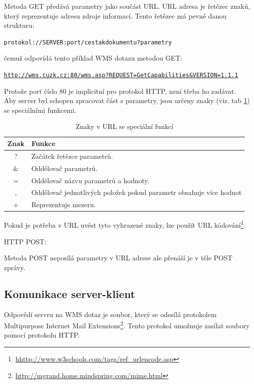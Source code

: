 \documentclass[a4paper,12pt]{article}
\begin{document}
Metoda GET předává parametry jako součást URL. URL adresa  je řetězec znaků, který reprezentuje adresu zdroje informací. Tento řetězec má pevně danou strukturu:
	
\begin{alltt}\footnotesize
	protokol://SERVER: port / cesta k dokumentu ? parametry
\end{alltt}
	
čemuž odpovídá tento příklad WMS dotazu metodou GET:

\begin{alltt}\footnotesize
\url{http://wms.cuzk.cz:80/wms.asp?REQUEST=GetCapabilities&VERSION=1.1.1}
\end{alltt}

\newpage

Protože port číslo 80 je implicitní pro protokol HTTP, není třeba ho zadávat.   
Aby server byl schopen zpracovat část s parametry, jsou určeny znaky (viz. tab \ref{tab:myfirsttable}) se speciálními funkcemi. 

\begin{table}[h]
\centering
\begin{tabular}{|c|l|}      \hline
  Znak      &    Funkce				\\ \hline
   ?        &  Začátek řetězce parametrů.      	\\ \hline
   \&       &  Oddělovač parametrů.   		\\ \hline
   =        &  Oddělovač názvu parametrů a hodnoty.    \\ \hline
   ,        &  Oddělovač jednotlivých položek pokud parametr obsahuje více hodnot\\ \hline
   +        &  Reprezentuje mezeru. 	\\ \hline
\end{tabular}
\caption{Znaky v URL se speciální funkcí}
\label{tab:myfirsttable}
\end{table}

Pokud je potřeba v URL uvést tyto vyhrazené znaky, lze použít URL kódování\footnote{\url{hhttp://www.w3schools.com/tags/ref_urlencode.asp}}.

HTTP POST:

Metoda POST neposílá parametry v URL adrese ale přenáší je v těle POST zprávy.


\subsection{Komunikace server-klient}

Odpovědí servru na WMS dotaz je soubor, který se odesílá protokolem Multipurpose Internet Mail Extensions\footnote{\url{http://mgrand.home.mindspring.com/mime.html}}. Tento protokol umožnuje zasílat soubory pomocí protokolu HTTP.
\end{document}
